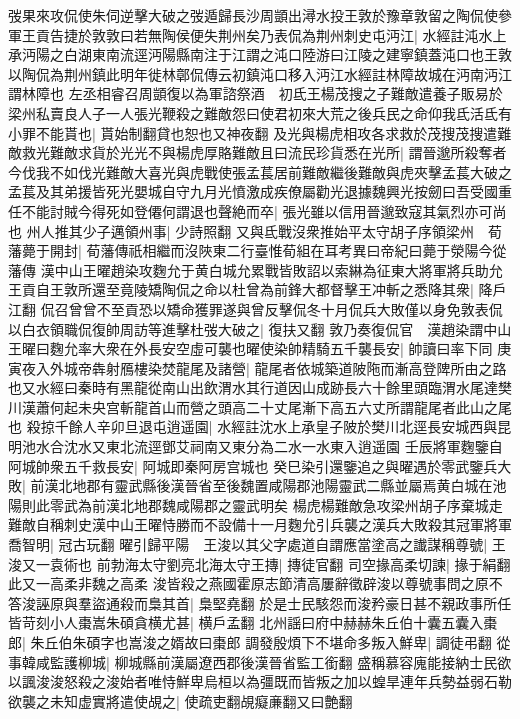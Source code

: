 弢果來攻侃使朱伺逆擊大破之弢遁歸長沙周顗出潯水投王敦於豫章敦留之陶侃使參軍王貢告捷於敦敦曰若無陶侯便失荆州矣乃表侃為荆州刺史屯沔江|{
	水經註沌水上承沔陽之白湖東南流逕沔陽縣南注于江謂之沌口陸游曰江陵之建寧鎮蓋沌口也王敦以陶侃為荆州鎮此明年徙林鄣侃傳云初鎮沌口移入沔江水經註林障故城在沔南沔江謂林障也}
左丞相睿召周顗復以為軍諮祭酒　初氐王楊茂搜之子難敵遣養子販易於梁州私賣良人子一人張光鞭殺之難敵怨曰使君初來大荒之後兵民之命仰我氐活氐有小罪不能貰也|{
	貰始制翻貸也恕也又神夜翻}
及光與楊虎相攻各求救於茂搜茂搜遣難敵救光難敵求貨於光光不與楊虎厚賂難敵且曰流民珍貨悉在光所|{
	謂晉邈所殺奪者}
今伐我不如伐光難敵大喜光與虎戰使張孟萇居前難敵繼後難敵與虎夾擊孟萇大破之孟萇及其弟援皆死光嬰城自守九月光憤激成疾僚屬勸光退據魏興光按劒曰吾受國重任不能討賊今得死如登僊何謂退也聲絶而卒|{
	張光雖以信用晉邈致寇其氣烈亦可尚也}
州人推其少子邁領州事|{
	少詩照翻}
又與氐戰沒衆推始平太守胡子序領梁州　荀藩薨于開封|{
	荀藩傳祇相繼而沒陜東二行臺惟荀組在耳考異曰帝紀曰薨于滎陽今從藩傳}
漢中山王曜趙染攻麴允于黄白城允累戰皆敗詔以索綝為征東大將軍將兵助允　王貢自王敦所還至竟陵矯陶侃之命以杜曾為前鋒大都督擊王冲斬之悉降其衆|{
	降戶江翻}
侃召曾曾不至貢恐以矯命獲罪遂與曾反擊侃冬十月侃兵大敗僅以身免敦表侃以白衣領職侃復帥周訪等進擊杜弢大破之|{
	復扶又翻}
敦乃奏復侃官　漢趙染謂中山王曜曰麴允率大衆在外長安空虛可襲也曜使染帥精騎五千襲長安|{
	帥讀曰率下同}
庚寅夜入外城帝犇射鴈樓染焚龍尾及諸營|{
	龍尾者依城築道陂陁而漸高登陴所由之路也又水經曰秦時有黑龍從南山出飲渭水其行道因山成跡長六十餘里頭臨渭水尾達樊川漢蕭何起未央宫斬龍首山而營之頭高二十丈尾漸下高五六丈所謂龍尾者此山之尾也}
殺掠千餘人辛卯旦退屯逍遥園|{
	水經註沈水上承皇子陂於樊川北逕長安城西與昆明池水合沈水又東北流逕鄧艾祠南又東分為二水一水東入逍遥園}
壬辰將軍麴鑒自阿城帥衆五千救長安|{
	阿城即秦阿房宫城也}
癸巳染引還鑒追之與曜遇於零武鑒兵大敗|{
	前漢北地郡有靈武縣後漢晉省至後魏置咸陽郡池陽靈武二縣並屬焉黄白城在池陽則此零武為前漢北地郡魏咸陽郡之靈武明矣}
楊虎楊難敵急攻梁州胡子序棄城走難敵自稱刺史漢中山王曜恃勝而不設備十一月麴允引兵襲之漢兵大敗殺其冠軍將軍喬智明|{
	冠古玩翻}
曜引歸平陽　王浚以其父字處道自謂應當塗高之䜟謀稱尊號|{
	王浚又一袁術也}
前勃海太守劉亮北海太守王摶|{
	摶徒官翻}
司空掾高柔切諫|{
	掾于絹翻此又一高柔非魏之高柔}
浚皆殺之燕國霍原志節清高屢辭徵辟浚以尊號事問之原不答浚誣原與羣盜通殺而梟其首|{
	梟堅堯翻}
於是士民駭怨而浚矜豪日甚不親政事所任皆苛刻小人棗嵩朱碩貪横尤甚|{
	横戶孟翻}
北州謡曰府中赫赫朱丘伯十囊五囊入棗郎|{
	朱丘伯朱碩字也嵩浚之婿故曰棗郎}
調發殷煩下不堪命多叛入鮮卑|{
	調徒弔翻}
從事韓咸監護柳城|{
	柳城縣前漢屬遼西郡後漢晉省監工銜翻}
盛稱慕容廆能接納士民欲以諷浚浚怒殺之浚始者唯恃鮮卑烏桓以為彊既而皆叛之加以蝗旱連年兵勢益弱石勒欲襲之未知虚實將遣使覘之|{
	使疏吏翻覘癡亷翻又曰艶翻}
